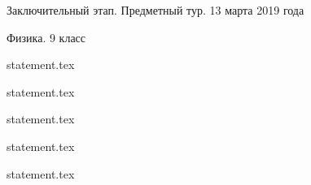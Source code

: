 \documentclass[a4paper,11pt, oneside]{book}
\begin{document}
\vspace{-3mm}
\vspace{-5mm}

\normalsize

\begin{center}
    Заключительный этап. Предметный тур. 13 марта 2019 года
    
    Физика. 9 класс
\end{center}

\parindent=0cm

{statement.tex}

{statement.tex}

{statement.tex}

\newpage

{statement.tex}

{statement.tex}
\end{document}
